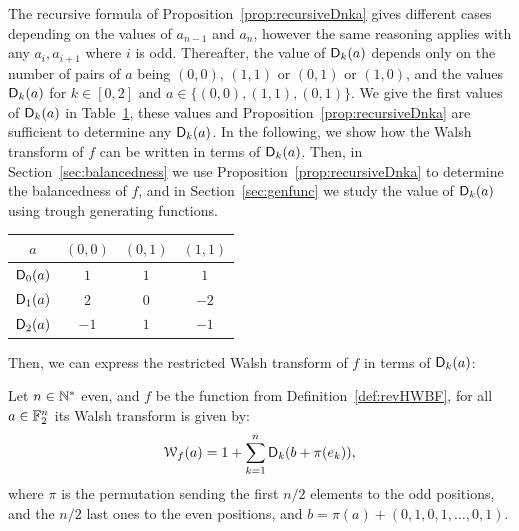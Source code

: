 \documentclass[11pt]{llncs}
\begin{document}

The recursive formula of Proposition~\ref{prop:recursiveDnka} gives different cases depending on the values of $a_{n-1}$ and $a_n$, however the same reasoning applies with any $a_i, a_{i+1}$ where $i$ is odd. 
Thereafter, the value of $\Dnka{n}{k}{a}$ depends only on the number of pairs of $a$ being $(0,0)$, $(1,1)$ or $(0,1)$ or $(1,0)$, and the values $\Dnka{2}{k}{a}$ for $k \in [0,2]$ and $a \in \{ (0,0),(1,1),(0,1)\}$. 
We give the first values of $\Dnka{2}{k}{a}$ in Table~\ref{tab:Dnka},  these values and Proposition~\ref{prop:recursiveDnka} are sufficient to determine any $\Dnka{n}{k}{a}$. 
In the following, we show how the Walsh transform of $f$ can be written in terms of $\Dnka{n}{k}{a}$. Then, in Section~\ref{sec:balancedness} we use Proposition~\ref{prop:recursiveDnka} to determine the balancedness of $f$, and in Section~\ref{sec:genfunc} we study the value of $\Dnka{n}{k}{a}$ using trough generating functions.





\begin{table}[H]
	\centering
	\begin{tabular}{|c|c|c|c|}
		\hline
		$a$ & $(0,0)$ & $(0,1)$ & $(1,1)$ \\ \hline
		$\Dnka{2}{0}{a}$ &$1$&$1$ & $1$\\ \hline
		$\Dnka{2}{1}{a}$ &$2$& $0$ & $-2$\\ \hline
		$\Dnka{2}{2}{a}$ &$-1$&$1$ & $-1$\\ \hline
	\end{tabular}
	\label{tab:Dnka}
\end{table}



Then, we can express the restricted Walsh transform of $f$ in terms of $\Dnka{n}{k}{a}$:


\begin{proposition}\label{prop:WT}
	Let $n \in \N^*$ even, and $f$ be the function from Definition~\ref{def:revHWBF}, for all $a\in \F_2^n$ its Walsh transform is given by:
	\[ \wt{f}(a)=1+\sum_{k=1}^n \Dnka{n}{k}{b+\pi(e_k)},\]
where $\pi$ is the permutation sending the first $n/2$ elements to the odd positions, and the $n/2$ last ones to the even positions, and $b=\pi(a)+(0,1,0,1,\ldots,0,1)$.
\end{proposition}
\end{document}
